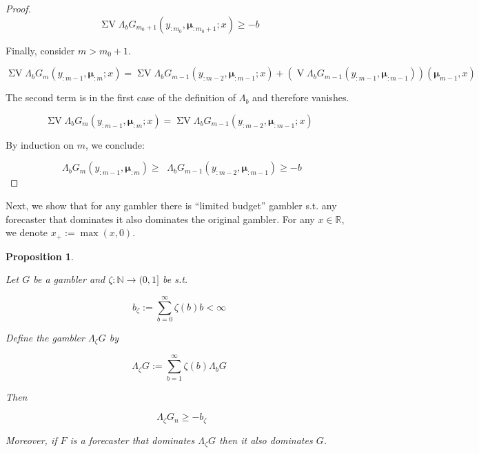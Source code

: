 \documentclass[aop,preprint]{imsart}
\numberwithin{equation}{section}
\theoremstyle{definition}
\theoremstyle{plain}
\newtheorem{proposition}{Proposition}[section]
\newcommand{\Nats}{\mathbb{N}}
\newcommand{\Reals}{\mathbb{R}}
\DeclareMathOperator{\V}{V}
\DeclareMathOperator{\SV}{\Sigma V}
\DeclareMathOperator{\SVM}{\Sigma V_{\min}}
\newcommand{\Bd}{\Lambda}
\newcommand{\BM}{\bm{\mu}}
\begin{document}
\begin{proof}
$$\SV \Bd_b G_{m_0+1}\left(y_{:m_0},\BM_{:m_0+1};x\right) \geq -b$$

Finally, consider ${m > m_0 + 1}$.

$$\SV \Bd_b G_{m}\left(y_{:m-1},\BM_{:m};x\right) = \SV \Bd_b G_{m-1}\left(y_{:m-2},\BM_{:m-1};x\right) + \left(\V \Bd_b G_{m-1}\left(y_{:m-1},\BM_{:m-1}\right)\right)\left(\BM_{m-1},x\right)$$

The second term is in the first case of the definition of $\Bd_b$ and therefore vanishes.

$$\SV \Bd_b G_{m}\left(y_{:m-1},\BM_{:m};x\right) = \SV \Bd_b G_{m-1}\left(y_{:m-2},\BM_{:m-1};x\right)$$

By induction on ${m}$, we conclude:

$$\SVM \Bd_b G_{m}\left(y_{:m-1},\BM_{:m}\right) \geq \SVM \Bd_b G_{m-1}\left(y_{:m-2},\BM_{:m-1}\right) \geq -b$$
\end{proof}

Next, we show that for any gambler there is \enquote{limited budget} gambler s.t. any forecaster that dominates it also dominates the original gambler. For any $x \in \Reals$, we denote $x_+:=\max(x,0)$.

\begin{proposition}
\label{prp:frugal_gambler}

Let $G$ be a gambler and $\zeta: \Nats \rightarrow (0,1]$ be s.t.

\begin{equation}
b_\zeta := \sum_{b=0}^\infty \zeta\left(b\right) b < \infty
\end{equation}

Define the gambler $\Bd_\zeta G$ by

\begin{equation}
\Bd_\zeta G := \sum_{b = 1}^\infty \zeta\left(b\right) \Bd_b G
\end{equation}

Then

\begin{equation}
\label{eqn:prp_furgal_gambler__svm_b_zeta}
\SVM \Bd_\zeta G_n \geq -b_\zeta
\end{equation}

Moreover, if $F$ is a forecaster that dominates $\Bd_\zeta G$ then it also dominates $G$.

\end{proposition}
\end{document}
